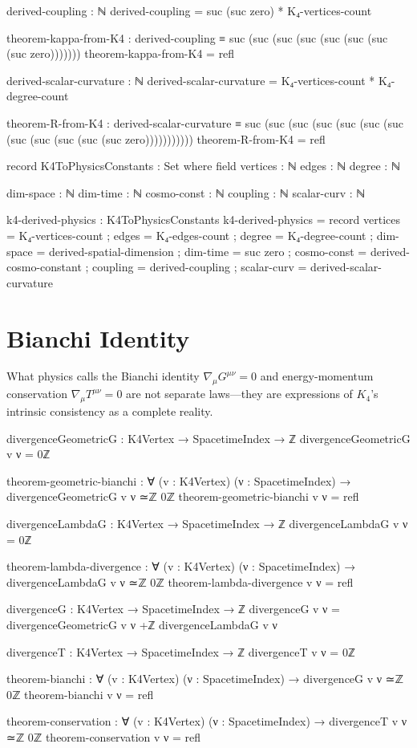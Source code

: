 \documentclass[11pt,a4paper]{book}
\begin{document}
\begin{code}
derived-coupling : ℕ
derived-coupling = suc (suc zero) * K₄-vertices-count

theorem-kappa-from-K4 : derived-coupling ≡ suc (suc (suc (suc (suc (suc (suc (suc zero)))))))
theorem-kappa-from-K4 = refl

derived-scalar-curvature : ℕ
derived-scalar-curvature = K₄-vertices-count * K₄-degree-count

theorem-R-from-K4 : derived-scalar-curvature ≡ suc (suc (suc (suc (suc (suc (suc (suc (suc (suc (suc (suc zero)))))))))))
theorem-R-from-K4 = refl

record K4ToPhysicsConstants : Set where
  field
    vertices : ℕ
    edges    : ℕ
    degree   : ℕ
    
    dim-space : ℕ
    dim-time  : ℕ
    cosmo-const : ℕ
    coupling : ℕ
    scalar-curv : ℕ

k4-derived-physics : K4ToPhysicsConstants
k4-derived-physics = record
  { vertices = K₄-vertices-count
  ; edges = K₄-edges-count
  ; degree = K₄-degree-count
  ; dim-space = derived-spatial-dimension
  ; dim-time = suc zero
  ; cosmo-const = derived-cosmo-constant
  ; coupling = derived-coupling
  ; scalar-curv = derived-scalar-curvature
  }
\end{code}

\section{Bianchi Identity}

What physics calls the Bianchi identity $\nabla_\mu G^{\mu\nu} = 0$ and energy-momentum conservation $\nabla_\mu T^{\mu\nu} = 0$ are not separate laws—they are expressions of $K_4$'s intrinsic consistency as a complete reality.

\begin{code}
divergenceGeometricG : K4Vertex → SpacetimeIndex → ℤ
divergenceGeometricG v ν = 0ℤ

theorem-geometric-bianchi : ∀ (v : K4Vertex) (ν : SpacetimeIndex) → 
  divergenceGeometricG v ν ≃ℤ 0ℤ
theorem-geometric-bianchi v ν = refl

divergenceLambdaG : K4Vertex → SpacetimeIndex → ℤ
divergenceLambdaG v ν = 0ℤ

theorem-lambda-divergence : ∀ (v : K4Vertex) (ν : SpacetimeIndex) →
  divergenceLambdaG v ν ≃ℤ 0ℤ
theorem-lambda-divergence v ν = refl

divergenceG : K4Vertex → SpacetimeIndex → ℤ
divergenceG v ν = divergenceGeometricG v ν +ℤ divergenceLambdaG v ν

divergenceT : K4Vertex → SpacetimeIndex → ℤ
divergenceT v ν = 0ℤ

theorem-bianchi : ∀ (v : K4Vertex) (ν : SpacetimeIndex) → divergenceG v ν ≃ℤ 0ℤ
theorem-bianchi v ν = refl

theorem-conservation : ∀ (v : K4Vertex) (ν : SpacetimeIndex) → divergenceT v ν ≃ℤ 0ℤ
theorem-conservation v ν = refl
\end{code}
\end{document}
